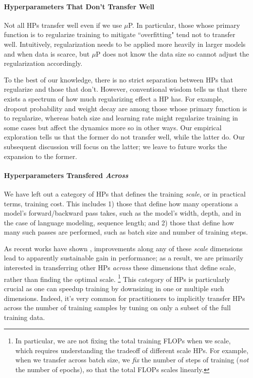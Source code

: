 \documentclass{article}
\theoremstyle{definition}
\begin{document}
\paragraph{Hyperparameters That Don't Transfer Well}
Not all HPs transfer well even if we use $\mu$P.
In particular, those whose primary function is to regularize training to mitigate ``overfitting" tend not to transfer well.
Intuitively, regularization needs to be applied more heavily in larger models and when data is scarce, but $\mu$P does not know the data size so cannot adjust the regularization accordingly.

To the best of our knowledge, there is no strict separation between HPs that regularize and those that don't.
However, conventional wisdom tells us that there exists a spectrum of how much regularizing effect a HP has.
For example, dropout probability and weight decay are among those whose primary function is to regularize, whereas batch size and learning rate might regularize training in some cases but affect the dynamics more so in other ways.
Our empirical exploration tells us that the former do not transfer well, while the latter do.
Our subsequent discussion will focus on the latter; we leave to future works the expansion to the former.

\paragraph{Hyperparameters Transfered \emph{Across}}

We have left out a category of HPs that defines the training \emph{scale}, or in practical terms, training cost.
This includes 1) those that define how many operations a model's forward/backward pass takes, such as the model's width, depth, and in the case of language modeling, sequence length; and 2) those that define how many such passes are performed, such as batch size and number of training steps.

As recent works have shown \citep{rosenfeld_constructive_2019,brown2020language,kaplan_scaling_2020}, improvements along any of these \emph{scale} dimensions lead to apparently sustainable gain in performance; as a result, we are primarily interested in transferring other HPs \emph{across} these dimensions that define scale, rather than finding the optimal scale.%
\footnote{
In particular, we are not fixing the total training FLOPs when we scale, which requires understanding the tradeoff of different scale HPs.
For example, when we transfer across batch size, we \emph{fix} the number of steps of training (\emph{not} the number of epochs), so that the total FLOPs scales linearly.}
This category of HPs is particularly crucial as one can speedup training by downsizing in one or multiple such dimensions.
Indeed, it's very common for practitioners to implicitly transfer HPs across the number of training samples by tuning on only a subset of the full training data.
\end{document}
